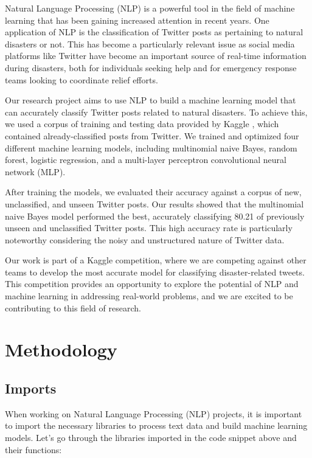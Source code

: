 \documentclass[11pt]{diazessay} %
\begin{document}
Natural Language Processing (NLP) is a powerful tool in the field of machine learning that has been gaining increased attention in recent years. One application of NLP is the classification of Twitter posts as pertaining to natural disasters or not. This has become a particularly relevant issue as social media platforms like Twitter have become an important source of real-time information during disasters, both for individuals seeking help and for emergency response teams looking to coordinate relief efforts.

Our research project aims to use NLP to build a machine learning model that can accurately classify Twitter posts related to natural disasters. To achieve this, we used a corpus of training and testing data provided by Kaggle \cite{nlp-getting-started}, which contained already-classified posts from Twitter. We trained and optimized four different machine learning models, including multinomial naive Bayes, random forest, logistic regression, and a multi-layer perceptron convolutional neural network (MLP).

After training the models, we evaluated their accuracy against a corpus of new, unclassified, and unseen Twitter posts. Our results showed that the multinomial naive Bayes model performed the best, accurately classifying 80.21 of previously unseen and unclassified Twitter posts. This high accuracy rate is particularly noteworthy considering the noisy and unstructured nature of Twitter data.

Our work is part of a Kaggle competition, where we are competing against other teams to develop the most accurate model for classifying disaster-related tweets. This competition provides an opportunity to explore the potential of NLP and machine learning in addressing real-world problems, and we are excited to be contributing to this field of research.

\section*{Methodology}
\subsection{Imports}

When working on Natural Language Processing (NLP) projects, it is important to import the necessary libraries to process text data and build machine learning models. Let's go through the libraries imported in the code snippet above and their functions:
\end{document}
